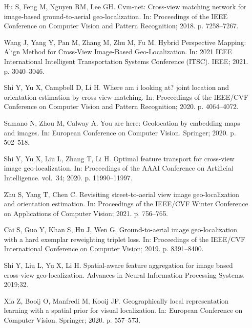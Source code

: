 \documentclass[10pt,letterpaper]{article}
\begin{document}
\begin{thebibliography}{10}
  Hu S, Feng M, Nguyen RM, Lee GH.
  \newblock Cvm-net: Cross-view matching network for image-based ground-to-aerial
    geo-localization.
  \newblock In: Proceedings of the IEEE Conference on Computer Vision and Pattern
    Recognition; 2018. p. 7258--7267.
  
  Wang J, Yang Y, Pan M, Zhang M, Zhu M, Fu M.
  \newblock Hybrid Perspective Mapping: Align Method for Cross-View Image-Based
    Geo-Localization.
  \newblock In: 2021 IEEE International Intelligent Transportation Systems
    Conference (ITSC). IEEE; 2021. p. 3040--3046.
  
  Shi Y, Yu X, Campbell D, Li H.
  \newblock Where am i looking at? joint location and orientation estimation by
    cross-view matching.
  \newblock In: Proceedings of the IEEE/CVF Conference on Computer Vision and
    Pattern Recognition; 2020. p. 4064--4072.
  
  Samano N, Zhou M, Calway A.
  \newblock You are here: Geolocation by embedding maps and images.
  \newblock In: European Conference on Computer Vision. Springer; 2020. p.
    502--518.
  
  Shi Y, Yu X, Liu L, Zhang T, Li H.
  \newblock Optimal feature transport for cross-view image geo-localization.
  \newblock In: Proceedings of the AAAI Conference on Artificial Intelligence.
    vol.~34; 2020. p. 11990--11997.
  
  Zhu S, Yang T, Chen C.
  \newblock Revisiting street-to-aerial view image geo-localization and
    orientation estimation.
  \newblock In: Proceedings of the IEEE/CVF Winter Conference on Applications of
    Computer Vision; 2021. p. 756--765.
  
  Cai S, Guo Y, Khan S, Hu J, Wen G.
  \newblock Ground-to-aerial image geo-localization with a hard exemplar
    reweighting triplet loss.
  \newblock In: Proceedings of the IEEE/CVF International Conference on Computer
    Vision; 2019. p. 8391--8400.
  
  Shi Y, Liu L, Yu X, Li H.
  \newblock Spatial-aware feature aggregation for image based cross-view
    geo-localization.
  \newblock Advances in Neural Information Processing Systems. 2019;32.
  
  Xia Z, Booij O, Manfredi M, Kooij JF.
  \newblock Geographically local representation learning with a spatial prior for
    visual localization.
  \newblock In: European Conference on Computer Vision. Springer; 2020. p.
    557--573.
  

\end{thebibliography}
\end{document}
